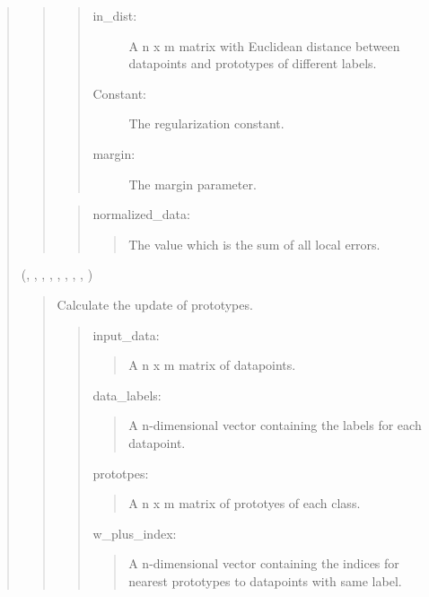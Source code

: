 \documentclass[letterpaper,10pt,english,openany,oneside]{sphinxmanual}
\begin{document}
\begin{quote}
\begin{quote}
\begin{quote}
\begin{description}
\item[{in\_dist:}] \leavevmode
A n x m matrix with Euclidean distance between datapoints and prototypes of different labels.

\item[{Constant:}] \leavevmode
The regularization constant.

\item[{margin:}] \leavevmode
The margin parameter.

\end{description}
\end{quote}

\begin{quote}

normalized\_data:
\begin{quote}

The value which is the sum of all local errors.
\end{quote}
\end{quote}
\end{quote}

(, , , , , , , , )
\begin{quote}

Calculate the update of prototypes.

\begin{quote}

input\_data:
\begin{quote}

A n x m matrix of datapoints.
\end{quote}

data\_labels:
\begin{quote}

A n-dimensional vector containing the labels for each datapoint.
\end{quote}

prototpes:
\begin{quote}

A n x m matrix of prototyes of each class.
\end{quote}

w\_plus\_index:
\begin{quote}

A n-dimensional vector containing the indices for nearest prototypes to datapoints with same label.
\end{quote}


\end{quote}
\end{quote}
\end{quote}
\end{document}
